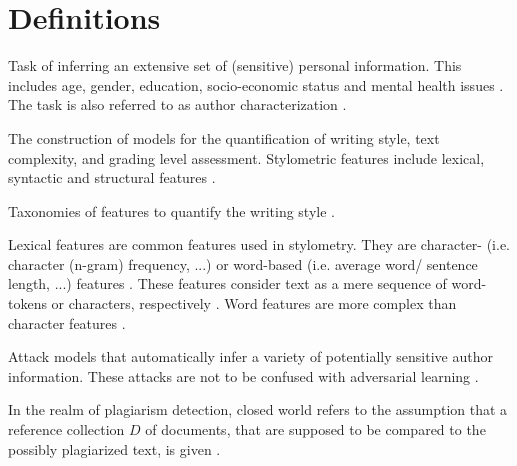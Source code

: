 \section{Definitions}
\label{sec:definitions}


\begin{definition}
    Task of inferring an extensive set of (sensitive) personal information.
    This includes age, gender, education, socio-economic status and mental health issues \cite{emmery_adversarial_2021,stamatatos_survey_2009}.
    The task is also referred to as author characterization \cite{stamatatos_survey_2009}.
\end{definition}

\begin{definition}
    [Stylometry]
    The construction of models for the quantification of writing style, text complexity, and grading level assessment.
    Stylometric features include lexical, syntactic and structural features \cite{stein_intrinsic_2011}.
\end{definition}

\begin{definition}
    Taxonomies of features to quantify the writing style \cite{stamatatos_survey_2009}.
\end{definition}

\begin{definition}
    Lexical features are common features used in stylometry.
    They are character- (i.e. character (n-gram) frequency, ...) 
    or word-based (i.e. average word/ sentence length, ...) features \cite{stein_intrinsic_2011}. 
    These features consider text as a mere sequence of word-tokens or characters, respectively \cite{stamatatos_survey_2009}.
    Word features are more complex than character features \cite{stamatatos_survey_2009}.
\end{definition}

\begin{definition}
    Attack models that automatically infer a variety of potentially sensitive author information.
    These attacks are not to be confused with adversarial learning \cite{emmery_adversarial_2021}.
\end{definition}

\begin{definition}
    In the realm of plagiarism detection, closed world refers to the assumption that a reference collection $D$ of documents, that are supposed to be compared to the possibly plagiarized text, is given \cite{stein_intrinsic_2011}.
\end{definition}

